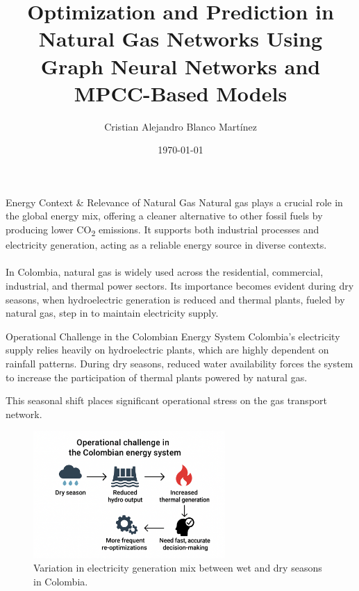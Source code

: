 \documentclass[hyperref={colorlinks,citecolor=blue,linkcolor=blue,urlcolor=blue}]{beamer}
\title[]{Optimization and Prediction in Natural Gas Networks Using Graph Neural Networks and MPCC-Based Models}
\author{Cristian Alejandro Blanco Martínez}
\institute{Universidad Tecnológica de Pereira \\ 
Grupo de investigación Automática}
\date{\today}
\begin{document}
\begin{frame}
  \titlepage
\end{frame}




\begin{frame}{Energy Context \& Relevance of Natural Gas}
\justifying
Natural gas plays a crucial role in the global energy mix, offering a cleaner alternative to other fossil fuels by producing lower CO\textsubscript{2} emissions. It supports both industrial processes and electricity generation, acting as a reliable energy source in diverse contexts. 
\\ \\
In Colombia, natural gas is widely used across the residential, commercial, industrial, and thermal power sectors. Its importance becomes evident during dry seasons, when hydroelectric generation is reduced and thermal plants, fueled by natural gas, step in to maintain electricity supply.
\end{frame}

\begin{frame}{Operational Challenge in the Colombian Energy System}
\justifying
Colombia’s electricity supply relies heavily on hydroelectric plants, which are highly dependent on rainfall patterns. During dry seasons, reduced water availability forces the system to increase the participation of thermal plants powered by natural gas. 

This seasonal shift places significant operational stress on the gas transport network. 

\begin{figure}[h]
    \centering
    \includegraphics[width=0.65\textwidth]{figures/hydro_vs_thermal.png}
    \caption{Variation in electricity generation mix between wet and dry seasons in Colombia.}
\end{figure}
\end{frame}
\end{document}
